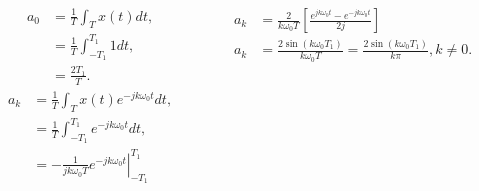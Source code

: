 \begin{frame}
    {
        \begin{columns}
          \begin{column}{0.5\textwidth}
                \begin{equation*}
                    \begin{split}
                       a_0 &= \frac{1}{T} \int_{T}x(t)dt,\\
                       &=  \frac{1}{T} \int_{-T_1}^{T_1}1dt,\\
                       &= \frac{2T_1}{T}.
                    \end{split}
                \end{equation*}
                \pause
                \begin{equation*}
                    \begin{split}
                       a_k &= \frac{1}{T} \int_{T}x(t)e^{-jk\omega_0 t}dt,\\
                       &=  \frac{1}{T} \int_{-T_1}^{T_1}e^{-jk\omega_0 t}dt,\\
                       &= -\left. \frac{1}{jk\omega_0 T}e^{-jk\omega_0 t}\right|^{T_1}_{-T_1}
                    \end{split}
                \end{equation*}
          \end{column}
          \begin{column}{0.5\textwidth}
                \pause

                \pause

                \begin{equation*}
                    \begin{split}
                       a_k &= \frac{2}{k\omega_0 T}\left[\frac{e^{jk\omega_0 t} - e^{-jk\omega_0 t}}{2j}\right]\\
                       a_k &= \frac{2\sin(k\omega_0 T_1)}{k\omega_0 T} = \frac{2\sin(k\omega_0 T_1)}{k\pi}, k \neq 0.
                    \end{split}
                \end{equation*}
          \end{column}
        \end{columns}


    }
\end{frame}

